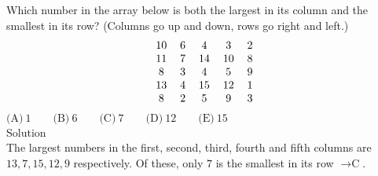 

Which number in the array below is both the largest in its column and the smallest in its row? (Columns go up and down, rows go right and left.) \[\begin{tabular}[t]{ccccc} 10 & 6 & 4 & 3 & 2 \\ 11 & 7 & 14 & 10 & 8 \\ 8 & 3 & 4 & 5 & 9 \\ 13 & 4 & 15 & 12 & 1 \\ 8 & 2 & 5 & 9 & 3 \end{tabular}\]
$\text{(A)}\ 1 \qquad \text{(B)}\ 6 \qquad \text{(C)}\ 7 \qquad \text{(D)}\ 12 \qquad \text{(E)}\ 15$
\\
Solution
\\
The largest numbers in the first, second, third, fourth and fifth columns are $13,7,15,12,9$ respectively. Of these, only $7$ is the smallest in its row $\rightarrow \boxed{\text{C}}$.
